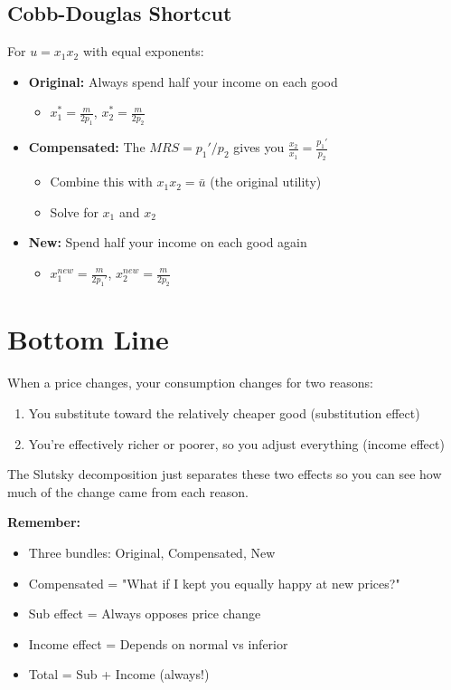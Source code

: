 \documentclass[12pt]{article}
\begin{document}
\subsection*{Cobb-Douglas Shortcut}

For $u = x_1 x_2$ with equal exponents:

\begin{itemize}[leftmargin=*]
\item \textbf{Original:} Always spend half your income on each good
\begin{itemize}
\item $x_1^* = \frac{m}{2p_1}$, $x_2^* = \frac{m}{2p_2}$
\end{itemize}

\item \textbf{Compensated:} The $MRS = p_1'/p_2$ gives you $\frac{x_2}{x_1} = \frac{p_1'}{p_2}$
\begin{itemize}
\item Combine this with $x_1 x_2 = \bar{u}$ (the original utility)
\item Solve for $x_1$ and $x_2$
\end{itemize}

\item \textbf{New:} Spend half your income on each good again
\begin{itemize}
\item $x_1^{new} = \frac{m}{2p_1'}$, $x_2^{new} = \frac{m}{2p_2}$
\end{itemize}
\end{itemize}

\section*{Bottom Line}

When a price changes, your consumption changes for two reasons:

\begin{enumerate}
\item You substitute toward the relatively cheaper good (substitution effect)
\item You're effectively richer or poorer, so you adjust everything (income effect)
\end{enumerate}

The Slutsky decomposition just separates these two effects so you can see how much of the change came from each reason.

\vspace{0.5cm}

\begin{tcolorbox}[colback=yellow!20!white,colframe=orange!75!black]
\textbf{Remember:}
\begin{itemize}[leftmargin=*]
\item Three bundles: Original, Compensated, New
\item Compensated = "What if I kept you equally happy at new prices?"
\item Sub effect = Always opposes price change
\item Income effect = Depends on normal vs inferior
\item Total = Sub + Income (always!)
\end{itemize}
\end{tcolorbox}
\end{document}
